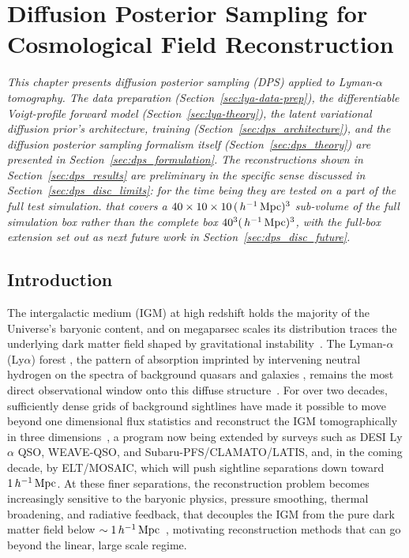 
\chapter{Diffusion Posterior Sampling for Cosmological Field Reconstruction}
\label{ch:dps}

\textit{This chapter presents diffusion posterior sampling (DPS) applied to Lyman-$\alpha$ tomography. The data preparation (Section~\ref{sec:lya-data-prep}),
  the differentiable Voigt-profile forward model (Section~\ref{sec:lya-theory}), the latent variational diffusion prior's architecture, training
  (Section~\ref{sec:dps_architecture}), and the diffusion posterior sampling formalism itself (Section~\ref{sec:dps_theory}) are presented in Section~\ref{sec:dps_formulation}. The
  reconstructions shown in Section~\ref{sec:dps_results} are preliminary in the specific sense discussed in Section~\ref{sec:dps_disc_limits}: for the time being they are tested on a part of the full test simulation. that covers a 
  $40\times10\times10\,(\,h^{-1}\,\mathrm{Mpc})^3$ sub-volume of the full simulation box rather than the complete box $40^3 (\,h^{-1}\,\mathrm{Mpc})^3$, with the full-box extension set out as next future work in Section~\ref{sec:dps_disc_future}.}

\section{Introduction}
\label{sec:dps_intro}



The intergalactic medium (IGM) at high redshift holds the majority of the Universe's baryonic content, and on megaparsec scales its distribution traces the underlying dark matter field shaped by gravitational instability~\citep{Meiksin_2009,McQuinn_2016,Bi_1997}. The Lyman-$\alpha$ (Ly$\alpha$) forest , the pattern of absorption imprinted by intervening neutral hydrogen on the spectra of background quasars and galaxies , remains the most direct observational window onto this diffuse structure~\citep{Gunn_peterson,Lynds_1971,Williger_2000}. For over two decades, sufficiently dense grids of background sightlines have made it possible to move beyond one dimensional flux statistics and reconstruct the IGM tomographically in three dimensions~\citep{caucci2008recoveringtopologyigmz2,Lee_2014,Lee_2018}, a program now being extended by surveys such as DESI Ly$\alpha$ QSO, WEAVE-QSO, and Subaru-PFS/CLAMATO/LATIS, and, in the coming decade, by ELT/MOSAIC, which will push sightline separations down toward $1\,h^{-1}\,\mathrm{Mpc}$. At these finer separations, the reconstruction problem becomes increasingly sensitive to the baryonic physics, pressure smoothing, thermal broadening, and radiative feedback, that decouples the IGM from the pure dark matter field below $\sim 1\,h^{-1}\,\mathrm{Mpc}$~\citep{schaye_2000,Viel_2002,nasir2017effect}, motivating reconstruction methods that can go beyond the linear, large scale regime.


